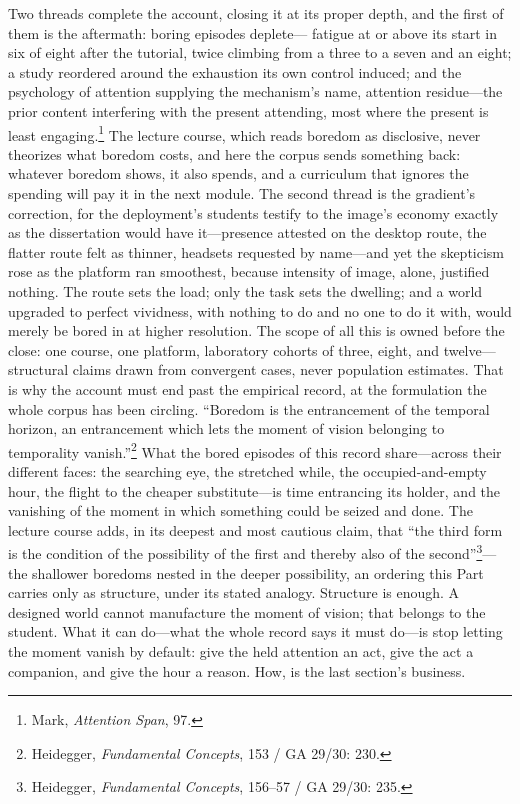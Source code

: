 Two threads complete the account, closing it at its proper depth, and the first of them is the aftermath: boring episodes deplete--- fatigue at or above its start in six of eight after the tutorial, twice climbing from a three to a seven and an eight; a study reordered around the exhaustion its own control induced; and the psychology of attention supplying the mechanism's name, attention residue---the prior content interfering with the present attending, most where the present is least engaging.\footnote{Mark, \textit{Attention Span}, 97.} The lecture course, which reads boredom as disclosive, never theorizes what boredom costs, and here the corpus sends something back: whatever boredom shows, it also spends, and a curriculum that ignores the spending will pay it in the next module. The second thread is the gradient's correction, for the deployment's students testify to the image's economy exactly as the dissertation would have it---presence attested on the desktop route, the flatter route felt as thinner, headsets requested by name---and yet the skepticism rose as the platform ran smoothest, because intensity of image, alone, justified nothing. The route sets the load; only the task sets the dwelling; and a world upgraded to perfect vividness, with nothing to do and no one to do it with, would merely be bored in at higher resolution. The scope of all this is owned before the close: one course, one platform, laboratory cohorts of three, eight, and twelve---structural claims drawn from convergent cases, never population estimates. That is why the account must end past the empirical record, at the formulation the whole corpus has been circling. ``Boredom is the entrancement of the temporal horizon, an entrancement which lets the moment of vision belonging to temporality vanish.''\footnote{Heidegger, \textit{Fundamental Concepts}, 153 / GA 29/30: 230.} What the bored episodes of this record share---across their different faces: the searching eye, the stretched while, the occupied-and-empty hour, the flight to the cheaper substitute---is time entrancing its holder, and the vanishing of the moment in which something could be seized and done. The lecture course adds, in its deepest and most cautious claim, that ``the third form is the condition of the possibility of the first and thereby also of the second''\footnote{Heidegger, \textit{Fundamental Concepts}, 156--57 / GA 29/30: 235.}---the shallower boredoms nested in the deeper possibility, an ordering this Part carries only as structure, under its stated analogy. Structure is enough. A designed world cannot manufacture the moment of vision; that belongs to the student. What it can do---what the whole record says it must do---is stop letting the moment vanish by default: give the held attention an act, give the act a companion, and give the hour a reason. How, is the last section's business.

